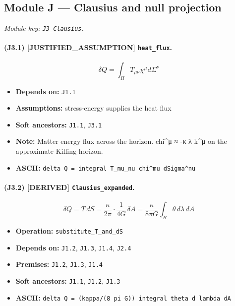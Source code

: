 \documentclass[11pt,a4paper]{article}
\theoremstyle{remark}\newtheorem*{caution}{Caution}
\newcommand{\tagbox}[1]{\textsc{[#1]}}
\begin{document}
\subsection{Module J --- Clausius and null projection}
\textit{Module key: \texttt{J3\_Clausius}.}
\paragraph{(J3.1) \tagbox{JUSTIFIED\_ASSUMPTION} \texttt{heat\_flux}.}
\begin{equation}
\delta Q=\int_H T_{\mu\nu}\chi^\mu d\Sigma^\nu
\tag{J3.1}
\end{equation}
\begin{itemize}\setlength{\itemsep}{0.12em}
\item \textbf{Depends on:} \texttt{J1.1}
\item \textbf{Assumptions:} stress-energy supplies the heat flux
\item \textbf{Soft ancestors:} \texttt{J1.1}, \texttt{J3.1}
\item \textbf{Note:} Matter energy flux across the horizon. chi^μ ≈ -κ λ k^μ on the approximate Killing horizon.
\item \textbf{ASCII:} \texttt{delta Q = integral T\_mu\_nu chi^mu dSigma^nu}
\end{itemize}
\paragraph{(J3.2) \tagbox{DERIVED} \texttt{Clausius\_expanded}.}
\begin{equation}
\delta Q=T\,dS=\frac{\kappa}{2\pi}\cdot\frac{1}{4G}\,\delta A=\frac{\kappa}{8\pi G}\int_H\theta\,d\lambda\,dA
\tag{J3.2}
\end{equation}
\begin{itemize}\setlength{\itemsep}{0.12em}
\item \textbf{Operation:} \texttt{substitute\_T\_and\_dS}
\item \textbf{Depends on:} \texttt{J1.2}, \texttt{J1.3}, \texttt{J1.4}, \texttt{J2.4}
\item \textbf{Premises:} \texttt{J1.2}, \texttt{J1.3}, \texttt{J1.4}
\item \textbf{Soft ancestors:} \texttt{J1.1}, \texttt{J1.2}, \texttt{J1.3}
\item \textbf{ASCII:} \texttt{delta Q = (kappa/(8 pi G)) integral theta d lambda dA}
\end{itemize}
\end{document}
